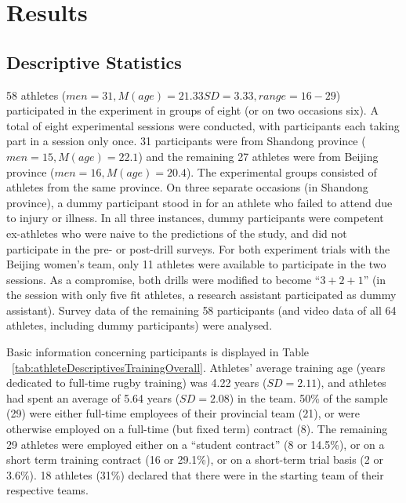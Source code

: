 \clearpage
\section{Results}


\subsection{Descriptive Statistics \label{sec:descriptives}}

58 athletes ($men = 31, M(age) = 21.33 SD = 3.33, range = 16-29$) participated in the experiment in groups of eight (or on two occasions six).  A total of eight experimental sessions were conducted, with participants each taking part in a session only once.  31 participants were from Shandong province ($men = 15, M(age) = 22.1$) and the remaining 27 athletes were from Beijing province ($men = 16, M(age) = 20.4$).  The experimental groups consisted of athletes from the same province. On three separate occasions (in Shandong province), a dummy participant stood in for an athlete who failed to attend due to injury or illness.  In all three instances, dummy participants were competent ex-athletes who were naive to the predictions of the study, and did not participate in the pre- or post-drill surveys. For both experiment trials with the Beijing women's team, only 11 athletes were available to participate in the two sessions.  As a compromise, both drills were modified to become ``$3+2+1$'' (in the session with only five fit athletes, a research assistant participated as dummy assistant).  Survey data of the remaining 58 participants (and video data of all 64 athletes, including dummy participants) were analysed.



Basic information concerning participants is displayed in Table ~\ref{tab:athleteDescriptivesTrainingOverall}.  Athletes' average training age (years dedicated to full-time rugby training) was 4.22 years ($SD = 2.11$), and athletes had spent an average of 5.64 years ($SD = 2.08$) in the team.  50\% of the sample (29) were either full-time employees of their provincial team (21), or were otherwise employed on a full-time (but fixed term) contract (8).  The remaining 29 athletes were employed either on a ``student contract'' (8 or 14.5\%), or on a short term training contract (16 or 29.1\%), or on a short-term trial basis (2 or 3.6\%).  18 athletes (31\%) declared that there were in the starting team of their respective teams.

